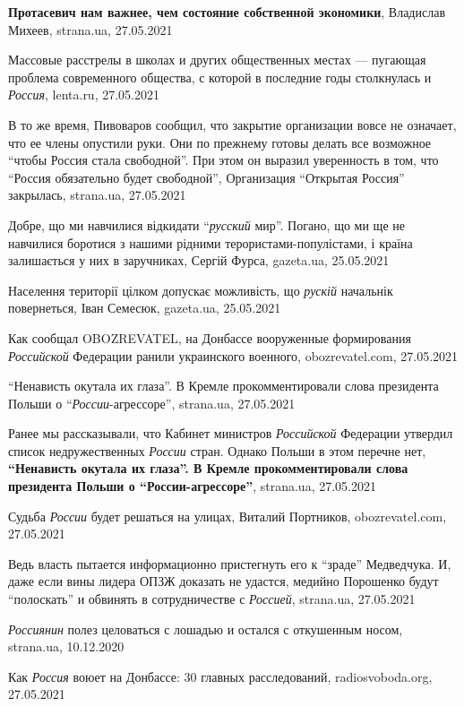 \textbf{Протасевич нам важнее, чем состояние собственной экономики}, Владислав Михеев, 
strana.ua, 27.05.2021

Массовые расстрелы в школах и других общественных местах — пугающая проблема
современного общества, с которой в последние годы столкнулась и \emph{Россия},
lenta.ru, 27.05.2021

В то же время, Пивоваров сообщил, что закрытие организации вовсе не означает,
что ее члены опустили руки. Они по прежнему готовы делать все возможное
\enquote{чтобы Россия стала свободной}. При этом он выразил уверенность в том,
что \enquote{Россия обязательно будет свободной}, Организация \enquote{Открытая
Россия} закрылась, strana.ua, 27.05.2021

Добре, що ми навчилися відкидати \enquote{\emph{русский} мир}. Погано, що ми ще
не навчилися боротися з нашими рідними терористами-популістами, і країна
залишається у них в заручниках, Сергій Фурса, gazeta.ua, 25.05.2021

Населення території цілком допускає можливість, що \emph{рускій} начальнік
повернеться, Іван Семесюк, gazeta.ua, 25.05.2021

Как сообщал OBOZREVATEL, на Донбассе вооруженные формирования \emph{Российской}
Федерации ранили украинского военного, obozrevatel.com, 27.05.2021

\enquote{Ненависть окутала их глаза}. В Кремле прокомментировали слова
президента Польши о \enquote{\emph{России}-агрессоре}, strana.ua, 27.05.2021

Ранее мы рассказывали, что Кабинет министров \emph{Российской} Федерации
утвердил список недружественных \emph{России} стран. Однако Польши в этом
перечне нет, \textbf{\enquote{Ненависть окутала их глаза}. В Кремле
прокомментировали слова президента Польши о \enquote{России-агрессоре}},
strana.ua, 27.05.2021

Судьба \emph{России} будет решаться на улицах, Виталий Портников,
obozrevatel.com, 27.05.2021

Ведь власть пытается информационно пристегнуть его к \enquote{зраде} Медведчука. И,
даже если вины лидера ОПЗЖ доказать не удастся, медийно Порошенко будут
\enquote{полоскать} и обвинять в сотрудничестве с \emph{Россией}, strana.ua, 27.05.2021

\emph{Россиянин} полез целоваться с лошадью и остался с откушенным носом, strana.ua, 10.12.2020

Как \emph{Россия} воюет на Донбассе: 30 главных расследований,
radiosvoboda.org, 27.05.2021

